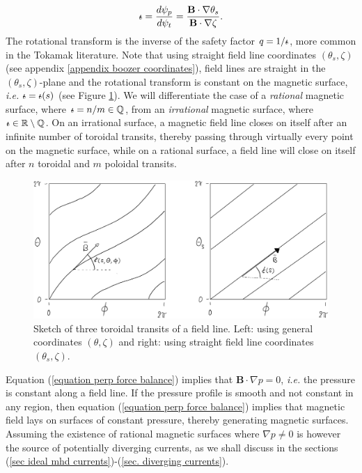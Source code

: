\documentclass[my_thesis.tex]{subfiles}
\begin{document}
\begin{equation}
	\text{$\iota\!\!$-} = \frac{d\psi_p}{d\psi_t}=\frac{\mathbf{B}\cdot\nabla\theta_s}{\mathbf{B}\cdot\nabla\zeta}.
\end{equation}
The rotational transform is the inverse of the safety factor $q=1/\text{$\iota\!\!$-}$, more common in the Tokamak literature. Note that using straight field line coordinates $(\theta_s,\zeta)$ (see appendix \ref{appendix boozer coordinates}), field lines are straight in the $(\theta_s,\zeta)$-plane and the rotational transform is constant on the magnetic surface, \textit{i.e.} $\text{$\iota\!\!$-}=\text{$\iota\!\!$-}(s)$ (see Figure \ref{fig sketch field line}). We will differentiate the case of a \emph{rational} magnetic surface, where $\text{$\iota\!\!$-}=n/m\in\mathbb{Q}$, from an \emph{irrational} magnetic surface, where $\text{$\iota\!\!$-}\in\mathbb{R}\setminus\mathbb{Q}$. On an irrational surface, a magnetic field line closes on itself after an infinite number of toroidal transits, thereby passing through virtually every point on the magnetic surface, while on a rational surface, a field line will close on itself after $n$ toroidal and $m$ poloidal transits.

\begin{figure}
	\centering
	\includegraphics[width=\linewidth]{images/SketchFieldLine-crop.pdf}
	\caption{Sketch of three toroidal transits of a field line. Left: using general coordinates $(\theta,\zeta)$ and right: using straight field line coordinates $(\theta_s,\zeta)$.}
	\label{fig sketch field line}
\end{figure}

Equation (\ref{equation perp force balance}) implies that $\mathbf{B}\cdot\nabla p=0$, \textit{i.e.} the pressure is constant along a field line. If the pressure profile is smooth and not constant in any region, then equation (\ref{equation perp force balance}) implies that magnetic field lays on surfaces of constant pressure, thereby generating magnetic surfaces. Assuming the existence of rational magnetic surfaces where $\nabla p\neq 0$ is however the source of potentially diverging currents, as we shall discuss in the sections (\ref{sec ideal mhd currents})-(\ref{sec. diverging currents}). 
\end{document}
